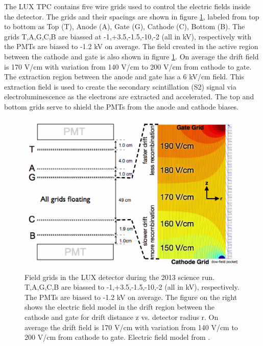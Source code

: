 The LUX TPC contains five wire grids used to control the electric fields inside the detector. The grids and their spacings are shown in figure \ref{fig:LUX_Fields}, labeled from top to bottom as Top  (T), Anode (A), Gate (G), Cathode (C), Bottom (B). The grids T,A,G,C,B are biassed at -1,+3.5,-1.5,-10,-2 (all in kV), respectively with the PMTs are biased to -1.2 kV on average. The field created in the active region between the cathode and gate is also shown in figure \ref{fig:LUX_Fields}. On average the drift field is 170 V/cm with variation from 140 V/cm to 200 V/cm  from cathode to gate. The extraction region between the anode and gate has a 6 kV/cm field. This extraction field is used to create the secondary scintillation (S2) signal via electroluminescence as the electrons are extracted and accelerated. The top and bottom grids serve to shield the PMTs from the anode and cathode biases.  

 \begin{figure}[h!]\centering
\includegraphics[scale=.4]{Chapter_LUX_Det/LUX_Feild_Grids_with_Field.png}
\caption{Field grids in the LUX detector during the 2013 science run. T,A,G,C,B are biassed to -1,+3.5,-1.5,-10,-2 (all in kV), respectively. The PMTs are biased to -1.2 kV on average. The figure on the right shows the electric field model in the drift region between the cathode and gate for drift distance z vs. detector radius r. On average the drift field is 170 V/cm with variation from 140 V/cm to 200 V/cm  from cathode to gate. Electric field model from  \cite{Scott_E_Field}.}
\label{fig:LUX_Fields}
\end{figure}

